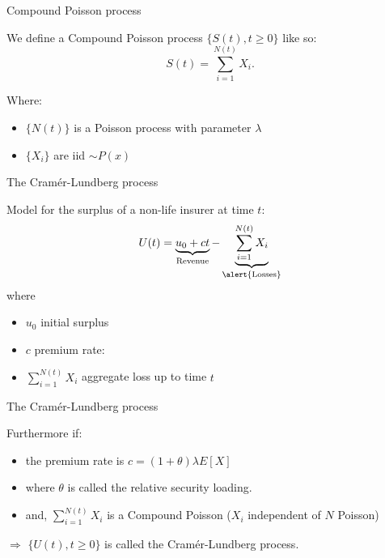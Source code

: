 \documentclass[11pt]{beamer}
\begin{document}
\begin{frame}{Compound Poisson process}

We define a \alert{Compound Poisson process} $\lbrace S(t), t\geq0 \rbrace$ like so:
$$S(t)=\sum_{i=1}^{N(t)}X_i.$$

Where:

\begin{itemize}

\item $\{N(t)\}$ is a Poisson process with parameter $\lambda$

\item $\{X_i\}$ are iid $\sim P(x)$


\end{itemize}

\end{frame}
\begin{frame}{ The Cram\'er-Lundberg process }

Model for the surplus of a non-life insurer at time $t$:
$$U(t)=\underbrace{u_0+ct}_\text{Revenue} - \underbrace{\sum_{i=1}^{N(t)}X_i}_\text{\alert{Losses}}$$
where
\begin{itemize}
\item $u_0$ initial surplus
\item $c$ premium rate:

\item $\sum_{i=1}^{N(t)}X_i$ aggregate loss up to time $t$
\end{itemize}


\end{frame}
\begin{frame}{ The Cram\'er-Lundberg process }

Furthermore if:

\vfill

\begin{itemize}
\item the premium rate is $c=(1+\theta)\lambda E[X]$

\vfill

\item where $\theta$ is called the \alert{relative security loading}.

\vfill


\item and, $\sum_{i=1}^{N(t)}X_i$ is a Compound Poisson ($X_i$ independent of $N$ Poisson)

\end{itemize}

\vfill


$\Longrightarrow$ $\{U(t), t\geq0 \}$ is called the \alert{Cram\'er-Lundberg process}.

\end{frame}
\end{document}
